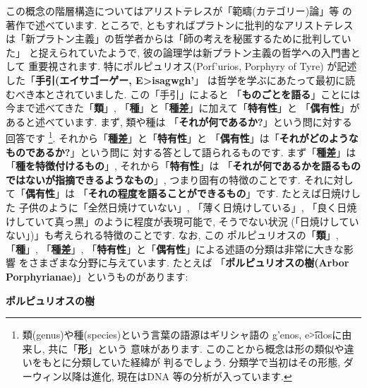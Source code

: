 この概念の階層構造についてはアリストテレスが「範疇(カテゴリー)論」等
の著作で述べています. ところで, ともすればプラトンに批判的なアリストテレス
は「新プラトン主義」の哲学者からは「師の考えを秘匿するために批判していた」
と捉えられていたようで, 彼の論理学は新プラトン主義の哲学への入門書として
重要視されます. 特にポルピュリオス(\textgreek{Porf'urios}, Porphyry of Tyre)
が記述した「\textbf{手引(エイサゴーゲー, \textgreek{E>isagwgh'}\cite{Barnes}}」
は哲学を学ぶにあたって最初に読むべき本とされていました. この「手引」によると
「\textbf{ものごとを語る}」ことには今まで述べてきた「\textbf{類}」,
 「\textbf{種}」と「\textbf{種差}」に加えて「\textbf{特有性}」と
「\textbf{偶有性}」があると述べています. まず, 類や種は
「\textbf{それが何であるか?}」という問に対する回答です
\footnote{類(genus)や種(species)という言葉の語源はギリシャ語の
\textgreek{g'enos}, \textgreek{e\t{>i}dos}に由来し, 共に「\textbf{形}」という
意味があります. このことから概念は形の類似や違いをもとに分類していた経緯が
判るでしょう. 分類学で当初はその形態, ダーウィン以降は進化, 現在はDNA
等の分析が入っています.}. それから「\textbf{種差}」と「\textbf{特有性}」と
「\textbf{偶有性}」は「\textbf{それがどのようなものであるか?}」という問に
対する答として語られるものです. まず「\textbf{種差}」は
「\textbf{種を特徴付けるもの}」, それから「\textbf{特有性}」は
「\textbf{それが何であるかを語るものではないが指摘できるようなもの}」,
 つまり固有の特徴のことです. それに対して「\textbf{偶有性}」は
「\textbf{それの程度を語ることができるもの}」です. たとえば日焼けした
子供のように「全然日焼けていない」, 「薄く日焼けしている」, 
「良く日焼けしていて真っ黒」のように程度が表現可能で, そうでない状況
(「日焼けしていない」)」も考えられる特徴のことです. なお, この
ポルピュリオスの「\textbf{類}」,「\textbf{種}」, 「\textbf{種差}」,
「\textbf{特有性}」と「\textbf{偶有性}」による述語の分類は非常に大きな影響
をさまざまな分野に与えています. たとえば
「\textbf{ポルピュリオスの樹(Arbor Porphyrianae)}」というものがあります: 
\newline


\begin{itembox}[c]{\textbf{ポルピュリオスの樹}}
{\tiny
{}
}
\end{itembox}

